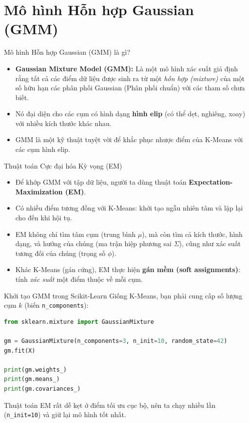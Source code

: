 \documentclass[aspectratio=169]{beamer}
\begin{document}
\section{Mô hình Hỗn hợp Gaussian (GMM)}

\begin{frame}{Mô hình Hỗn hợp Gaussian (GMM) là gì?}
    \begin{itemize}
        \item \textbf{Gaussian Mixture Model (GMM):} Là một mô hình xác suất giả định rằng tất cả các điểm dữ liệu được sinh ra từ một \textit{hỗn hợp (mixture)} của một số hữu hạn các phân phối Gaussian (Phân phối chuẩn) với các tham số chưa biết.
        \item Nó đại diện cho các cụm có hình dạng \textbf{hình elip} (có thể dẹt, nghiêng, xoay) với nhiều kích thước khác nhau.
        \item GMM là một kỹ thuật tuyệt vời để khắc phục nhược điểm của K-Means với các cụm hình elip.
    \end{itemize}
\end{frame}

\begin{frame}{Thuật toán Cực đại hóa Kỳ vọng (EM)}
    \begin{itemize}
        \item Để khớp GMM với tập dữ liệu, người ta dùng thuật toán \textbf{Expectation-Maximization (EM)}.
        \item Có nhiều điểm tương đồng với K-Means: khởi tạo ngẫu nhiên tâm và lặp lại cho đến khi hội tụ.
        \item EM không chỉ tìm tâm cụm (trung bình $\mu$), mà còn tìm cả kích thước, hình dạng, và hướng của chúng (ma trận hiệp phương sai $\Sigma$), cũng như xác suất tương đối của chúng (trọng số $\phi$).
        \item Khác K-Means (gán cứng), EM thực hiện \textbf{gán mềm (soft assignments)}: tính \textit{xác suất} một điểm thuộc về mỗi cụm.
    \end{itemize}
\end{frame}

\begin{frame}[fragile]{Khởi tạo GMM trong Scikit-Learn}
    Giống K-Means, bạn phải cung cấp số lượng cụm $k$ (biến \texttt{n\_components}):
    \begin{lstlisting}[language=Python]
from sklearn.mixture import GaussianMixture

gm = GaussianMixture(n_components=3, n_init=10, random_state=42)
gm.fit(X)

print(gm.weights_)
print(gm.means_)
print(gm.covariances_)
    \end{lstlisting}
    Thuật toán EM rất dễ kẹt ở điểm tối ưu cục bộ, nên ta chạy nhiều lần (\texttt{n\_init=10}) và giữ lại mô hình tốt nhất.
\end{frame}
\end{document}
